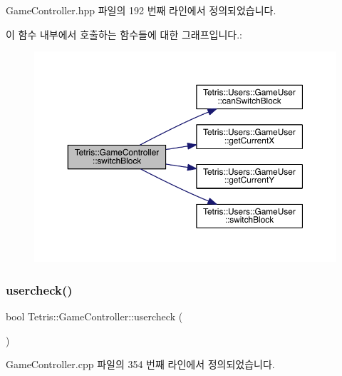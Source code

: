 Game\+Controller.\+hpp 파일의 192 번째 라인에서 정의되었습니다.

이 함수 내부에서 호출하는 함수들에 대한 그래프입니다.\+:
\nopagebreak
\begin{figure}[H]
\begin{center}
\leavevmode
\includegraphics[width=350pt]{class_tetris_1_1_game_controller_ad203991dc134e2ea36c9c40326da55c1_cgraph}
\end{center}
\end{figure}
\mbox{\label{class_tetris_1_1_game_controller_ab96e22daad51119b35cbee8cfb7385ef}} 
\subsubsection{\texorpdfstring{usercheck()}{usercheck()}\hspace{0.1cm}{\footnotesize\ttfamily [1/2]}}
{\footnotesize\ttfamily bool Tetris\+::\+Game\+Controller\+::usercheck (\begin{DoxyParamCaption}{ }\end{DoxyParamCaption})\hspace{0.3cm}{\ttfamily [protected]}}



Game\+Controller.\+cpp 파일의 354 번째 라인에서 정의되었습니다.

\mbox{\label{class_tetris_1_1_game_controller_ab96e22daad51119b35cbee8cfb7385ef}} 

